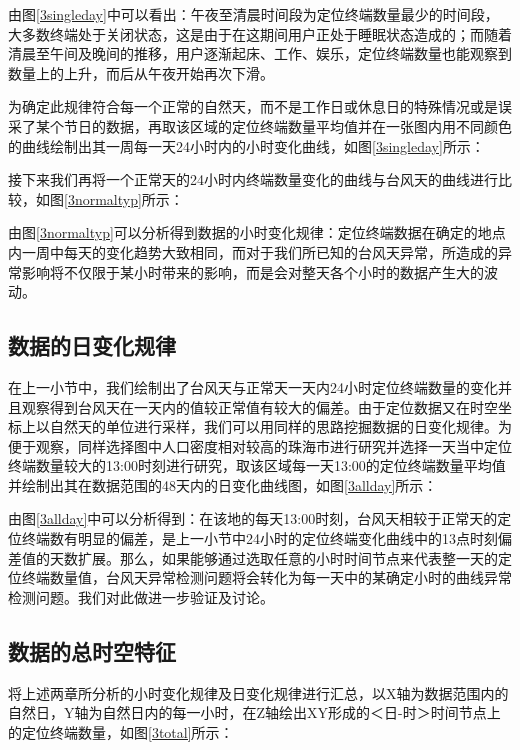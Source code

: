 \documentclass[a4paper,AutoFakeBold,oneside,12pt]{book}
\begin{document}

	由图\ref{3singleday}中可以看出：午夜至清晨时间段为定位终端数量最少的时间段，大多数终端处于关闭状态，这是由于在这期间用户正处于睡眠状态造成的；而随着清晨至午间及晚间的推移，用户逐渐起床、工作、娱乐，定位终端数量也能观察到数量上的上升，而后从午夜开始再次下滑。

	为确定此规律符合每一个正常的自然天，而不是工作日或休息日的特殊情况或是误采了某个节日的数据，再取该区域的定位终端数量平均值并在一张图内用不同颜色的曲线绘制出其一周每一天24小时内的小时变化曲线，如图\ref{3singleday}所示：


	接下来我们再将一个正常天的24小时内终端数量变化的曲线与台风天的曲线进行比较，如图\ref{3normaltyp}所示：


	由图\ref{3normaltyp}可以分析得到数据的小时变化规律：定位终端数据在确定的地点内一周中每天的变化趋势大致相同，而对于我们所已知的台风天异常，所造成的异常影响将不仅限于某小时带来的影响，而是会对整天各个小时的数据产生大的波动。

\subsection{数据的日变化规律}
	在上一小节中，我们绘制出了台风天与正常天一天内24小时定位终端数量的变化并且观察得到台风天在一天内的值较正常值有较大的偏差。由于定位数据又在时空坐标上以自然天的单位进行采样，我们可以用同样的思路挖掘数据的日变化规律。为便于观察，同样选择图中人口密度相对较高的珠海市进行研究并选择一天当中定位终端数量较大的13:00时刻进行研究，取该区域每一天13:00的定位终端数量平均值并绘制出其在数据范围的48天内的日变化曲线图，如图\ref{3allday}所示：


	由图\ref{3allday}中可以分析得到：在该地的每天13:00时刻，台风天相较于正常天的定位终端数有明显的偏差，是上一小节中24小时的定位终端变化曲线中的13点时刻偏差值的天数扩展。那么，如果能够通过选取任意的小时时间节点来代表整一天的定位终端数量值，台风天异常检测问题将会转化为每一天中的某确定小时的曲线异常检测问题。我们对此做进一步验证及讨论。

\subsection{数据的总时空特征}
	将上述两章所分析的小时变化规律及日变化规律进行汇总，以X轴为数据范围内的自然日，Y轴为自然日内的每一小时，在Z轴绘出XY形成的＜日-时＞时间节点上的定位终端数量，如图\ref{3total}所示：
\end{document}
